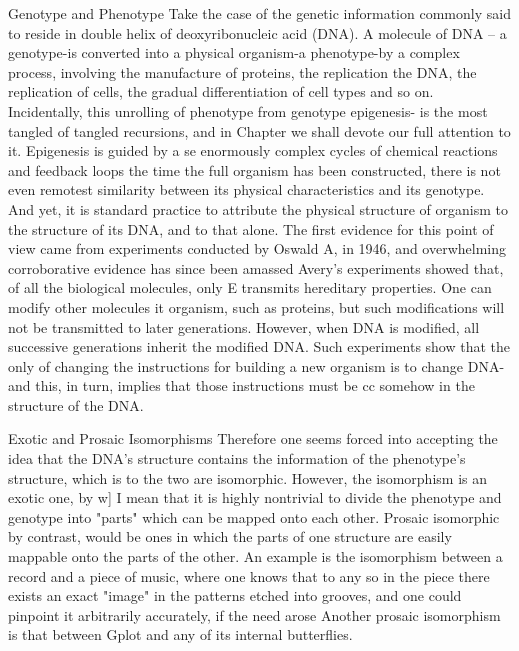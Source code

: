                               Genotype and Phenotype
Take the case of the genetic information commonly said to reside in double helix of
deoxyribonucleic acid (DNA). A molecule of DNA – a genotype-is converted into a
physical organism-a phenotype-by a complex process, involving the manufacture of
proteins, the replication the DNA, the replication of cells, the gradual differentiation of
cell types and so on. Incidentally, this unrolling of phenotype from genotype epigenesis-
is the most tangled of tangled recursions, and in Chapter we shall devote our full attention
to it. Epigenesis is guided by a se enormously complex cycles of chemical reactions and
feedback loops the time the full organism has been constructed, there is not even remotest
similarity between its physical characteristics and its genotype.
        And yet, it is standard practice to attribute the physical structure of organism to
the structure of its DNA, and to that alone. The first evidence for this point of view came
from experiments conducted by Oswald A, in 1946, and overwhelming corroborative
evidence has since been amassed Avery's experiments showed that, of all the biological
molecules, only E transmits hereditary properties. One can modify other molecules it
organism, such as proteins, but such modifications will not be transmitted to later
generations. However, when DNA is modified, all successive generations inherit the
modified DNA. Such experiments show that the only of changing the instructions for
building a new organism is to change DNA-and this, in turn, implies that those
instructions must be cc somehow in the structure of the DNA.

                        Exotic and Prosaic Isomorphisms
Therefore one seems forced into accepting the idea that the DNA's structure contains the
information of the phenotype's structure, which is to the two are isomorphic. However,
the isomorphism is an exotic one, by w] I mean that it is highly nontrivial to divide the
phenotype and genotype into "parts" which can be mapped onto each other. Prosaic
isomorphic by contrast, would be ones in which the parts of one structure are easily
mappable onto the parts of the other. An example is the isomorphism between a record
and a piece of music, where one knows that to any so in the piece there exists an exact
"image" in the patterns etched into grooves, and one could pinpoint it arbitrarily
accurately, if the need arose Another prosaic isomorphism is that between Gplot and any
of its internal butterflies.




